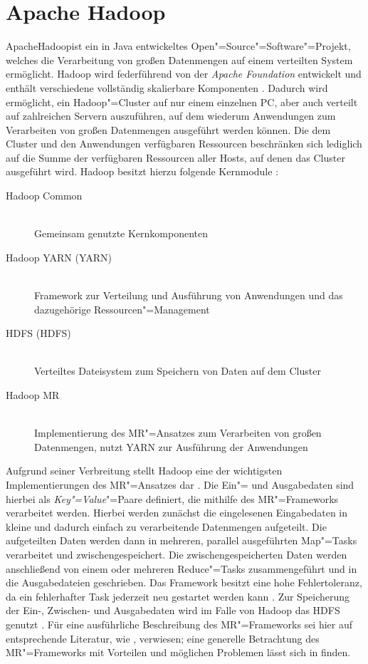 \section{Apache Hadoop}
\label{sec:hadoop}

Apache\texttrademark\space Hadoop\textregistered\space ist ein in Java entwickeltes Open"=Source"=Software"=Projekt, welches die Verarbeitung von großen Datenmengen auf einem verteilten System ermöglicht.
Hadoop wird federführend von der \emph{Apache Foundation} entwickelt und enthält verschiedene vollständig skalierbare Komponenten \cite{HadoopHomePage}.
Dadurch wird ermöglicht, ein Hadoop"=Cluster auf nur einem einzelnen PC, aber auch verteilt auf zahlreichen Servern auszuführen, auf dem wiederum Anwendungen zum Verarbeiten von großen Datenmengen ausgeführt werden können.
Die dem Cluster und den Anwendungen verfügbaren Ressourcen beschränken sich lediglich auf die Summe der verfügbaren Ressourcen aller Hosts, auf denen das Cluster ausgeführt wird.
Hadoop besitzt hierzu folgende Kernmodule \cite{HadoopHomePage}:

\begin{description}
	\item[Hadoop Common] \hfill \\
        Gemeinsam genutzte Kernkomponenten
	\item[Hadoop \acrshort{YARN} (\acrlong{YARN})] \hfill \\
        Framework zur Verteilung und Ausführung von Anwendungen und das dazugehörige Ressourcen"=Management
	\item[\acrlong{HDFS} (\acrshort{HDFS})] \hfill \\
        Verteiltes Dateisystem zum Speichern von Daten auf dem Cluster
	\item[Hadoop \gls{MR}] \hfill \\
        Implementierung des \gls{MR}"=Ansatzes zum Verarbeiten von großen Datenmengen, nutzt YARN zur Ausführung der Anwendungen
\end{description}

Aufgrund seiner Verbreitung stellt Hadoop eine der wichtigsten Implementierungen des \gls{MR}"=Ansatzes dar \cite{PoweredByHadoop}.
Die Ein"= und Ausgabedaten sind hierbei als \emph{Key"=Value}"=Paare definiert, die mithilfe des \gls{MR}"=Frameworks verarbeitet werden.
Hierbei werden zunächst die eingelesenen Eingabedaten in kleine und dadurch einfach zu verarbeitende Datenmengen aufgeteilt.
Die aufgeteilten Daten werden dann in mehreren, parallel ausgeführten Map"=Tasks verarbeitet und zwischengespeichert.
Die zwischengespeicherten Daten werden anschließend von einem oder mehreren Reduce"=Tasks zusammengeführt und in die Ausgabedateien geschrieben.
Das Framework besitzt eine hohe Fehlertoleranz, da ein fehlerhafter Task jederzeit neu gestartet werden kann \cite{Dean2004,Dean2010}.
Zur Speicherung der Ein-, Zwischen- und Ausgabedaten wird im Falle von Hadoop das HDFS genutzt \cite{HadoopMapRedTutorial271}.
Für eine ausführliche Beschreibung des \gls{MR}"=Frameworks sei hier auf entsprechende Literatur, wie \zB \cite{Dean2004,Dean2010}, verwiesen; eine generelle Betrachtung des \gls{MR}"=Frameworks mit Vorteilen und möglichen Problemen lässt sich \zB in \cite{Lee2012} finden.

